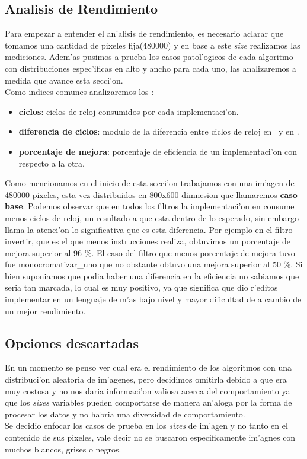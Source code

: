 \subsection{Analisis de Rendimiento}
Para empezar a entender el an'alisis de rendimiento, es necesario aclarar que tomamos una cantidad
de pixeles fija(480000) y en base a este \textit{size} realizamos las mediciones.
Adem'as pusimos a prueba los casos patol'ogicos de cada algoritmo con distribuciones espec'ificas en
alto y ancho para cada uno, las analizaremos a medida que avance esta secci'on.\\
Como indices comunes analizaremos los :\\
\begin{itemize}
 \item{} \textbf{ciclos}: ciclos de reloj consumidos por cada implementaci'on.
 \item{} \textbf{diferencia de ciclos}: modulo de la diferencia entre ciclos de reloj en \C \ y en \ass.
 \item{} \textbf{porcentaje de mejora}: porcentaje de eficiencia de un implementaci'on con respecto a la otra.
\end{itemize}
Como mencionamos en el inicio de esta secci'on trabajamos con una im'agen de 480000 pixeles, esta vez
distribuidos en 800x600 dimnesion que llamaremos \textbf{caso base}. Podemos observar que en todos los filtros 
la implementaci'on en \ass consume
menos ciclos de reloj, un resultado a que esta dentro de lo esperado, sin embargo llama la atenci'on
lo significativa que es esta diferencia. Por ejemplo en el filtro invertir, que es el que menos instrucciones
realiza, obtuvimos un porcentaje de mejora superior al 96 $\%$. El caso del filtro que menos porcentaje
de mejora tuvo fue monocromatizar_uno que no obstante obtuvo una mejora superior al 50 $\%$. Si bien
suponiamos que podia haber una diferencia en la eficiencia no sabiamos que seria tan marcada, lo cual es muy 
positivo, ya que significa que dio r'editos implementar en un lenguaje de m'as bajo nivel y mayor dificultad
de a cambio de un mejor rendimiento.\\
  
 





\subsection{Opciones descartadas}
En un momento se penso ver cual era el rendimiento de los algoritmos con una distribuci'on 
aleatoria de im'agenes, pero decidimos omitirla debido a que era muy costosa y no nos 
daria informaci'on valiosa acerca del comportamiento ya que los \textit{sizes} variables pueden comportarse 
de manera an'aloga por la forma de procesar los datos y no habria una diversidad de comportamiento.\\
Se decidio enfocar los casos de prueba en los \textit{sizes} de im'agen y no tanto en el contenido de 
sus pixeles, vale decir no se buscaron especificamente im'agnes con muchos blancos, grises o negros.   


